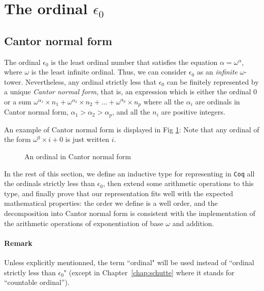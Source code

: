 \documentclass[a4paper]{book}
\begin{document}
\section{The ordinal \texorpdfstring{\(\epsilon_0\)}{epsilon0}}
\label{sec:epsilon0-intro}

\subsection{Cantor normal form}

The ordinal \(\epsilon_0\) is the least ordinal number that satisfies 
the equation \(\alpha = \omega^\alpha\), where \(\omega\) is 
the least infinite ordinal. Thus, we can consider \(\epsilon_0\) as an
\emph{infinite} \(\omega\)-tower.
Nevertheless, 
any ordinal strictly less that \(\epsilon_0\) 
can be finitely represented by a unique  \emph{Cantor normal form}, 
that is, an expression  which is either  the ordinal \(0\) or 
a sum  \(\omega^{\alpha_1} \times n_1 + \omega^{\alpha_2} \times n_2 + 
  \dots + \omega^{\alpha_p} \times n_p\) where all the \(\alpha_i\) 
are ordinals in Cantor  normal form, \(\alpha_1 > \alpha_2 > \alpha_p\), 
and all the \(n_i\) are positive integers.

An example of Cantor normal form is displayed in Fig \ref{fig:cnf-example}:
Note that  any ordinal of
the form \(\omega^0 \times i + 0\) is just written \(i\).

\begin{figure}[htb]
\centering
{}
\caption{\label{fig:cnf-example}
An ordinal in Cantor normal form}
\end{figure}




In the rest of this section, we define an inductive type for representing in \texttt{Coq}
all the ordinals strictly  less than  \(\epsilon_0\), then extend some arithmetic operations
to this type, and finally prove that our representation fits well with 
the expected mathematical properties: the order we define is a well order, 
and the decomposition into Cantor normal form  is consistent 
with the implementation of the arithmetic operations of exponentiation of base \(\omega\) 
and addition.

\paragraph*{Remark}
\label{sec:orgheadline65}
Unless explicitly mentionned, the term ``ordinal" will be used instead of
``ordinal strictly less than \(\epsilon_0\)" (except in Chapter~\ref{chap:schutte} where it stands for ``countable ordinal'').
\end{document}
